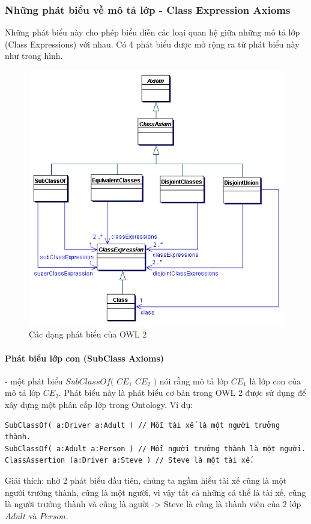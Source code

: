 \subsubsection{Những phát biểu về mô tả lớp - Class Expression Axioms}
Những phát biểu này cho phép biểu diễn các loại quan hệ giữa những mô tả lớp (Class Expressions) với nhau. Có 4 phát biểu được mở rộng ra từ phát biểu này như trong hình.
\begin{figure}[h]
	\centering
	\includegraphics[width=120mm]{Figures/classAxiom.png}
	\caption{Các dạng phát biểu của OWL 2\label{overflow}}
\end{figure}

\paragraph{Phát biểu lớp con (SubClass Axioms)} - một phát biểu $SubClassOf($ $CE_{1}$ $CE_{2}$ $)$ nói rằng mô tả lớp $CE_{1}$ là lớp con của mô tả lớp $CE_{2}$. Phát biểu này là phát biểu cơ bản trong OWL 2 được sử dụng để xây dựng một phân cấp lớp trong Ontology. Ví dụ:
\begin{verbatim}
SubClassOf( a:Driver a:Adult ) // Mỗi tài xế là một người trưởng thành.
SubClassOf( a:Adult a:Person ) // Mỗi người trưởng thành là một người.
ClassAssertion (a:Driver a:Steve ) // Steve là một tài xế.
\end{verbatim}
Giải thích: nhờ 2 phát biểu đầu tiên, chúng ta ngầm hiểu tài xế cũng là một người trưởng thành, cũng là một người, vì vậy tất cả những cá thể là tài xế, cũng là người trưởng thành và cũng là người -> Steve là cũng là thành viên của 2 lớp $Adult$ và $Person$.

